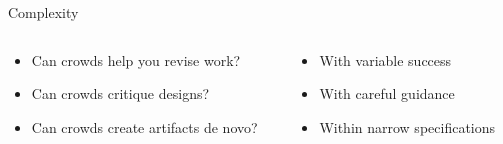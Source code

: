 \documentclass[presentation]{subfiles}
\begin{document}


\begin{frame}{Complexity}
  \begin{columns}
    \begin{column}{.6\textwidth}
    \end{column}
    \begin{column}{.4\textwidth}
    \end{column}
  \end{columns}
  \begin{columns}
  \begin{column}{.55\textwidth}
  \begin{itemize}
    \item<2-> Can crowds help you \alert{revise} work?\par
    \scriptsize{\textcite{bernsteinSoylent,Kim:2014:CSI:2556288.2556986,Nebeling:2016:WCW:2858036.2858169}\par}\normalsize{}
    \item<3-> Can crowds \alert{critique} designs?\par
    \scriptsize{\textcite{yuanAlmost,fuge2014analysis}\par}\normalsize{}
    \item<4-> Can crowds create artifacts \alert{de novo}?\par
    \scriptsize{\textcite{KimStoria,Kim2017,Hahn:2016:KAB:2858036.2858364,Lasecki:2014:LSR:2661334.2661352}\par}\normalsize{}
  \end{itemize}
  \end{column}
  \begin{column}{.45\textwidth}
      \begin{itemize}
        \item[$\Rightarrow$]<6-> \hfill With variable success\par
        \item[$\Rightarrow$]<7-> \hfill With careful guidance\par
        \item[$\Rightarrow$]<8-> \hfill Within narrow specifications\par
      \end{itemize}
  \end{column}
  \end{columns}
\end{frame}
\end{document}
